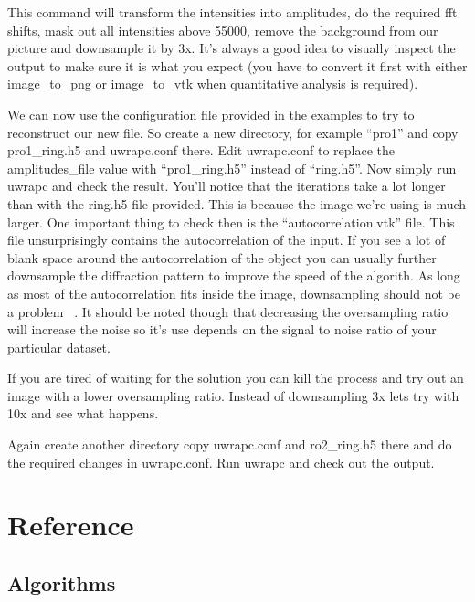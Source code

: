 \documentclass{report}
\begin{document}

This command will transform the intensities into amplitudes, do the required fft shifts, mask out all intensities
above 55000, remove the background from our picture and downsample it by 3x.
It's always a good idea to visually inspect the output to make sure it is what you expect (you have to convert it
first with either image\_to\_png or image\_to\_vtk when quantitative analysis is required).


We can now use the configuration file provided in the examples to try to reconstruct our new file.
So create a new directory, for example ``pro1'' and copy pro1\_ring.h5 and uwrapc.conf there.
Edit uwrapc.conf to replace the amplitudes\_file value with ``pro1\_ring.h5'' instead of ``ring.h5''.
Now simply run uwrapc and check the result. You'll notice that the iterations take a lot longer than 
with the ring.h5 file provided. This is because the image we're using is much larger. One important
thing to check then is the ``autocorrelation.vtk'' file. This file unsurprisingly contains the autocorrelation
of the input. If you see a lot of blank space around the autocorrelation of the object you can usually further
downsample the diffraction pattern to improve the speed of the algorith. As long as most of the autocorrelation
fits inside the image, downsampling should not be a problem ~\cite{Miao1998}. It should be noted though that 
decreasing the oversampling ratio will increase the noise so it's use depends on the signal to noise ratio
of your particular dataset.


If you are tired of waiting for the solution you can kill the process and try out an image
with a lower oversampling ratio. Instead of downsampling 3x lets try with 10x and see what happens.


Again create another directory copy uwrapc.conf and ro2\_ring.h5 there and do the required changes in uwrapc.conf.
Run uwrapc and check out the output.



\chapter{Reference}

\section{Algorithms}
\label{Algorithms}
\end{document}
